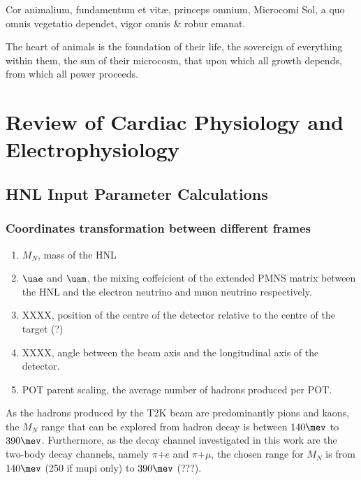 \begin{savequote}[8cm]
\textlatin{Cor animalium, fundamentum e\longs t vitæ, princeps omnium, Microco\longs mi Sol, a quo omnis vegetatio dependet, vigor omnis \& robur emanat.}

The heart of animals is the foundation of their life, the sovereign of everything within them, the sun of their microcosm, that upon which all growth depends, from which all power proceeds.
\end{savequote}

\chapter{\label{app:1-cardiophys}Review of Cardiac Physiology and Electrophysiology}

\minitoc

\section{HNL Input Parameter Calculations}
\label{sec:hnl-input}
    \subsection{Coordinates transformation between different frames}

    \begin{enumerate}
        \item $M_{N}$, mass of the HNL
        \item $\uae$ and $\uam$, the mixing coffeicient of the extended PMNS matrix between the HNL and the electron neutrino and muon neutrino respectively.
        \item XXXX, position of the centre of the detector relative to the centre of the target (?)
        \item XXXX, angle between the beam axis and the longitudinal axis of the detector.
        \item POT parent scaling, the average number of hadrons produced per POT.
    \end{enumerate}
    As the hadrons produced by the T2K beam are predominantly pions and kaons, the $M_{N}$ range that can be explored from hadron decay is between $140\mev$ to $390\mev$. 
    Furthermore, as the decay channel investigated in this work are the two-body decay channels, namely $\pi$+$e$ and $\pi$+$\mu$, the chosen range for $M_{N}$ is from $140\mev$ (250 if mupi only) to $390\mev$ (???).
    
